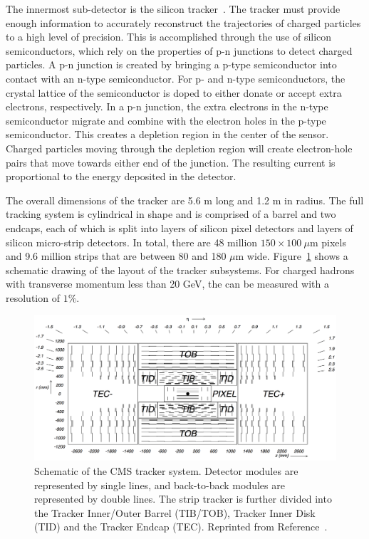 The innermost sub-detector is the silicon tracker~\cite{trackerTDR,trackerTDRAddendum}. The tracker must provide enough information to accurately reconstruct the trajectories of charged particles to a high level of precision. This is accomplished through the use of silicon semiconductors, which rely on the properties of p-n junctions to detect charged particles. A p-n junction is created by bringing a p-type semiconductor into contact with an n-type semiconductor. For p- and n-type semiconductors, the crystal lattice of the semiconductor is doped to either donate or accept extra electrons, respectively. In a p-n junction, the extra electrons in the n-type semiconductor migrate and combine with the electron holes in the p-type semiconductor. This creates a depletion region in the center of the sensor. Charged particles moving through the depletion region will create electron-hole pairs that move towards either end of the junction. The resulting current is proportional to the energy deposited in the detector.

The overall dimensions of the tracker are 5.6 m long and 1.2 m in radius. The full tracking system is cylindrical in shape and is comprised of a barrel and two endcaps, each of which is split into layers of silicon pixel detectors and layers of silicon micro-strip detectors. In total, there are 48 million $150\times100~\mu$m pixels and 9.6 million strips that are between 80 and 180 $\mu$m wide. Figure~\ref{fig:TrackerLayout} shows a schematic drawing of the layout of the tracker subsystems. For charged hadrons with transverse momentum \pt less than 20 GeV, the \pt can be measured with a resolution of $1\%$. 

\begin{figure}[h!]
	\centering
	\includegraphics[width=\linewidth]{Figures/Detector/tracker_layout.png}
       \caption{Schematic of the CMS tracker system. Detector modules are represented by single lines, and back-to-back modules are represented by double lines. The strip tracker is further divided into the Tracker Inner/Outer Barrel (TIB/TOB), Tracker Inner Disk (TID) and the Tracker Endcap (TEC). Reprinted from Reference~\cite{Chatrchyan2008zzk}.}
   	\label{fig:TrackerLayout}
\end{figure}

